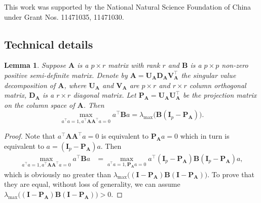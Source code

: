 \documentclass[12pt]{article} %
\newcommand{\bA}{\mathbf{A}}
\newcommand{\bB}{\mathbf{B}}
\newcommand{\bP}{\mathbf{P}}
\newcommand{\bI}{\mathbf{I}}
\newcommand{\bU}{\mathbf{U}}
\newcommand{\bD}{\mathbf{D}}
\newcommand{\bV}{\mathbf{V}}
\newtheorem{lemma}{Lemma}
\theoremstyle{definition}
\begin{document}
%
\vskip 14pt
This work was supported by the National Natural Science Foundation of
China under Grant Nos. 11471035, 11471030.
\par




\begin{appendices}
    \section{Technical details}\label{app}
\begin{lemma}\label{optProp}
    Suppose $\bA$ is a $p\times r$ matrix with rank $r$ and $\bB$ is a $p\times p$  non-zero positive semi-definite matrix.
    Denote by $\bA=\bU_\bA \bD_\bA \bV_\bA^\top$ the singular value decomposition of $\bA$, where $\bU_\bA$ and $\bV_\bA$ are $p\times r$ and $r\times r$ column orthogonal matrix, $\bD_\bA$ is a $r\times r$ diagonal matrix.
    Let $\bP_\bA=\bU_\bA \bU_\bA^\top$ be the projection matrix on the column space of $\bA$.
    Then
    \begin{equation}
        \max_{a^\top a=1, a^\top \bA \bA^\top a=0}a^\top \bB a=
        \lambda_{\max}\big(\bB(\bI_p-\bP_\bA)\big).
    \end{equation}
\end{lemma}
\begin{proof}
    Note that $a^\top \bA \bA^\top a=0$ is equivalent to $\bP_\bA a=0$ which in turn is equivalent to $a= (\bI_p-\bP_\bA)a$.
    Then
    \begin{equation}\label{eq:prop1eq1}
        \begin{aligned}
        \max_{a^\top a=1, a^\top \bA \bA^\top a=0}a^\top \bB a
            &=
        \max_{a^\top a=1, \bP_\bA a=0}a^\top(\bI_p-\bP_\bA) \bB (\bI_p-\bP_\bA)a,
        \end{aligned}
    \end{equation}
    which is obviously no greater than $\lambda_{\max}\big((\bI-\bP_\bA)\bB(\bI-\bP_\bA)\big)$.
    To prove that they are equal,  without loss of generality, we can assume $\lambda_{\max}\big((\bI-\bP_\bA)\bB(\bI-\bP_\bA)\big)>0$.

\end{proof}
\end{appendices}
\end{document}
